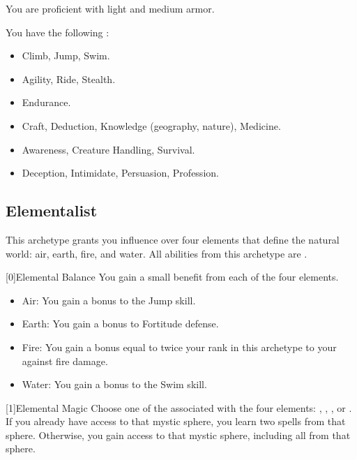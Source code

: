         You are proficient with light and medium armor.

        You have the following :
        \begin{itemize}
            \item {} Climb, Jump, Swim.
            \item {} Agility, Ride, Stealth.
            \item {} Endurance.
            \item {} Craft, Deduction, Knowledge (geography, nature), Medicine.
            \item {} Awareness, Creature Handling, Survival.
            \item {} Deception, Intimidate, Persuasion, Profession.
        \end{itemize}

    \newpage
    \subsection{Elementalist}\label{Elementalist}
        This archetype grants you influence over four elements that define the natural world: air, earth, fire, and water.
        All abilities from this archetype are .

        [0]{Elemental Balance} You gain a small benefit from each of the four elements.
        \begin{itemize}
            \item Air: You gain a  bonus to the Jump skill.
            \item Earth: You gain a  bonus to Fortitude defense.
            \item Fire: You gain a bonus equal to twice your rank in this archetype to your  against fire damage.
            \item Water: You gain a  bonus to the Swim skill.
        \end{itemize}

        [1]{Elemental Magic} Choose one of the  associated with the four elements: , , , or .
        If you already have access to that mystic sphere, you learn two spells from that sphere.
        Otherwise, you gain access to that mystic sphere, including all  from that sphere.

